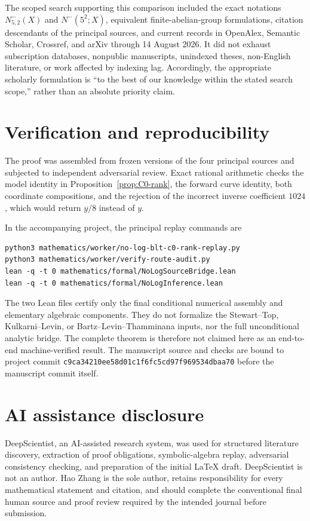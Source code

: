 \documentclass[11pt,reqno]{amsart}
\theoremstyle{definition}
\theoremstyle{remark}
\newcommand{\NoLogCount}{N^{-}_{5,2}}
\begin{document}
The scoped search supporting this comparison included the exact notations
\(\NoLogCount(X)\) and \(N^-(5^2;X)\), equivalent finite-abelian-group
formulations, citation descendants of the principal sources, and current
records in OpenAlex, Semantic Scholar, Crossref, and arXiv through 14 August
2026.  It did not exhaust subscription databases, nonpublic manuscripts,
unindexed theses, non-English literature, or work affected by indexing lag.
Accordingly, the appropriate scholarly formulation is ``to the best of our
knowledge within the stated search scope,'' rather than an absolute priority
claim.

\section{Verification and reproducibility}\label{sec:reproducibility}

The proof was assembled from frozen versions of the four principal sources
\cite{BartzLevinThamminana2025,KulkarniLevin2022,StewartTop1995,Stewart1991}
and subjected to independent adversarial review.  Exact rational arithmetic
checks the model identity in Proposition~\ref{prop:C0-rank}, the forward curve identity,
both coordinate compositions, and the rejection of the incorrect inverse
coefficient \(1024\), which would return \(y/8\) instead of \(y\).

In the accompanying project, the principal replay commands are
\begin{verbatim}
python3 mathematics/worker/no-log-blt-c0-rank-replay.py
python3 mathematics/worker/verify-route-audit.py
lean -q -t 0 mathematics/formal/NoLogSourceBridge.lean
lean -q -t 0 mathematics/formal/NoLogInference.lean
\end{verbatim}
The two Lean files certify only the final conditional numerical assembly and
elementary algebraic components.  They do not formalize the Stewart--Top,
Kulkarni--Levin, or Bartz--Levin--Thamminana inputs, nor the full unconditional
analytic bridge.  The complete theorem is therefore not claimed here as an
end-to-end machine-verified result.  The manuscript source and checks are bound
to project commit
\texttt{c9ca34210ee58d01c1f6fc5cd97f969534dbaa70} before the manuscript
commit itself.

\section*{AI assistance disclosure}

DeepScientist, an AI-assisted research system, was used for structured
literature discovery, extraction of proof obligations, symbolic-algebra
replay, adversarial consistency checking, and preparation of the initial
LaTeX draft.  DeepScientist is not an author.  Hao Zhang is the sole author,
retains responsibility for every mathematical statement and citation, and
should complete the conventional final human source and proof review required
by the intended journal before submission.
\end{document}
